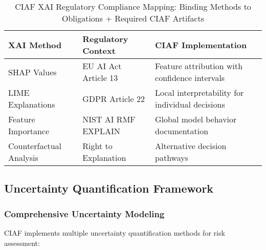 \documentclass[12pt,a4paper]{article}
\begin{document}
\begin{table}[H]
\centering
\small
\begin{tabular}{|p{3cm}|p{4cm}|p{6cm}|}
\hline
\textbf{XAI Method} & \textbf{Regulatory Context} & \textbf{CIAF Implementation} \\
\hline
SHAP Values & EU AI Act Article 13 & Feature attribution with confidence intervals \\
\hline
LIME Explanations & GDPR Article 22 & Local interpretability for individual decisions \\
\hline
Feature Importance & NIST AI RMF EXPLAIN & Global model behavior documentation \\
\hline
Counterfactual Analysis & Right to Explanation & Alternative decision pathways \\
\hline
\end{tabular}
\caption{CIAF XAI Regulatory Compliance Mapping: Binding Methods to Obligations + Required CIAF Artifacts}
\end{table}

\subsection{Uncertainty Quantification Framework}

\subsubsection{Comprehensive Uncertainty Modeling}

CIAF implements multiple uncertainty quantification methods for risk assessment:
\end{document}
